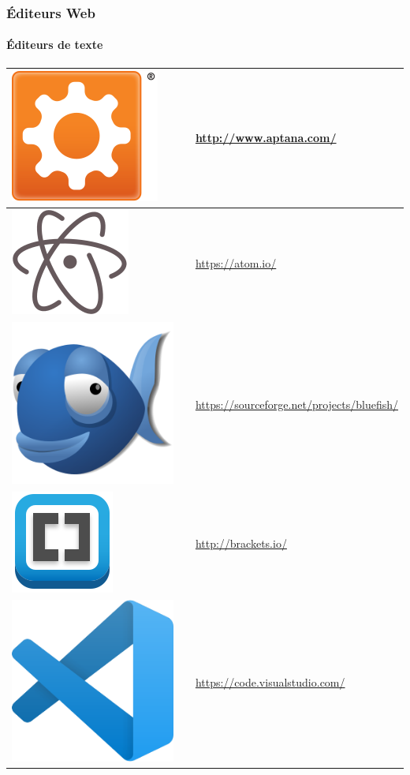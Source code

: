 \documentclass[xcolor=table]{beamer}
\begin{document}
\begin{frame}
\frametitle{Éditeurs Web}
\framesubtitle{Éditeurs de texte}

\def\arraystretch{0}

\begin{tabular}{p{}cp{}}%
	
	\hline
	
	\includegraphics[height=.8cm]{..//img/Bweb08-dev-web/aptana-logo.png} &
	& 
	\url{http://www.aptana.com/}\\
	
	\hline
	
	\includegraphics[height=.8cm]{..//img/Bweb08-dev-web/atom-logo.png} &
	& 
	\url{https://atom.io/}\\
	
	\hline
	
	\includegraphics[height=.8cm]{..//img/Bweb08-dev-web/bluefish-logo.png} &
	& 
	\url{https://sourceforge.net/projects/bluefish/}\\
	
	\hline
	
	\includegraphics[height=.8cm]{..//img/Bweb08-dev-web/brackets-logo.png} &
	& 
	\url{http://brackets.io/}\\
	
	\hline
	
	\includegraphics[height=.8cm]{..//img/Bweb08-dev-web/visual-studio-code-logo.png} &
	& 
	\url{https://code.visualstudio.com/}\\
	
	\hline
	
\end{tabular}

\end{frame}
\end{document}

